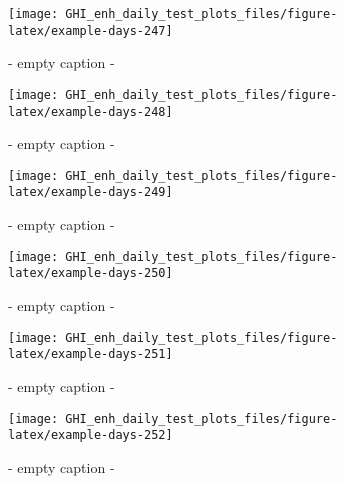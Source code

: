 \documentclass[
  10pt,
  a4paper,oneside]{article}
\begin{document}
\begin{figure}[H]

{\centering \texttt{[image: GHI\_enh\_daily\_test\_plots\_files/figure-latex/example-days-247]} 

}

\caption{ - empty caption - }\label{fig:example-days-247}
\end{figure}

\begin{figure}[H]

{\centering \texttt{[image: GHI\_enh\_daily\_test\_plots\_files/figure-latex/example-days-248]} 

}

\caption{ - empty caption - }\label{fig:example-days-248}
\end{figure}

\begin{figure}[H]

{\centering \texttt{[image: GHI\_enh\_daily\_test\_plots\_files/figure-latex/example-days-249]} 

}

\caption{ - empty caption - }\label{fig:example-days-249}
\end{figure}

\begin{figure}[H]

{\centering \texttt{[image: GHI\_enh\_daily\_test\_plots\_files/figure-latex/example-days-250]} 

}

\caption{ - empty caption - }\label{fig:example-days-250}
\end{figure}

\begin{figure}[H]

{\centering \texttt{[image: GHI\_enh\_daily\_test\_plots\_files/figure-latex/example-days-251]} 

}

\caption{ - empty caption - }\label{fig:example-days-251}
\end{figure}

\begin{figure}[H]

{\centering \texttt{[image: GHI\_enh\_daily\_test\_plots\_files/figure-latex/example-days-252]} 

}

\caption{ - empty caption - }\label{fig:example-days-252}
\end{figure}
\end{document}
